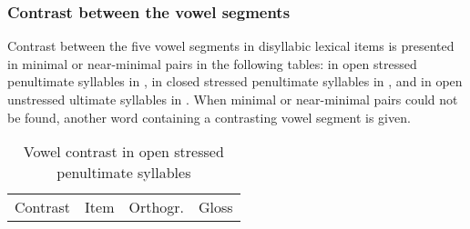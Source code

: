 \subsubsection[Contrast between the vowel segments]{Contrast between the vowel segments\label{Para_2.1.2.2}}

Contrast between the five vowel segments in disyllabic lexical items is presented in minimal or near-minimal pairs in the following tables: in open stressed penultimate syllables in , in closed stressed penultimate syllables in , and in open unstressed ultimate syllables in . When minimal or near-minimal pairs could not be found, another word containing a contrasting vowel segment is given.

\begin{table}
\caption{Vowel contrast in open stressed penultimate syllables\label{Table_2.7}}

\begin{tabular}{llll}

\lsptoprule
 Contrast & Item & Orthogr. & Gloss\\


\end{tabular}
\end{table}
